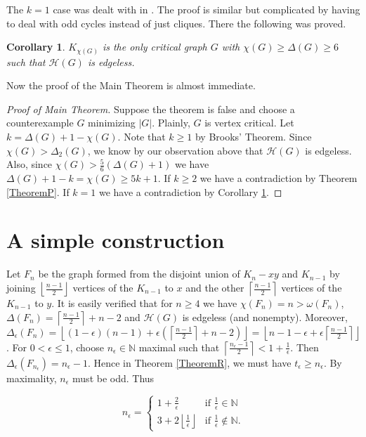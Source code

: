 \documentclass[12pt]{amsart}
\theoremstyle{plain}
\newtheorem{cor}[thm]{Corollary}
\theoremstyle{definition}
\theoremstyle{remark}
\newcommand{\fancy}[1]{\mathcal{#1}}
\newcommand{\card}[1]{\left|#1\right|}
\newcommand{\ceil}[1]{\left\lceil#1\right\rceil}
\newcommand{\floor}[1]{\left\lfloor#1\right\rfloor}
\newcommand{\parens}[1]{\left( #1 \right)}
\begin{document}
The $k = 1$ case was dealt with in \cite{DeltaCritical}.  The proof is similar but complicated by having to deal with odd cycles instead of just cliques. There the following was proved.

\begin{cor}\label{CorN}
$K_{\chi(G)}$ is the only critical graph $G$ with $\chi(G) \geq \Delta(G) \geq 6$ such that $\mathcal{H}(G)$ is edgeless.
\end{cor}

\noindent Now the proof of the Main Theorem is almost immediate.

\begin{proof}[Proof of Main Theorem]
Suppose the theorem is false and choose a counterexample $G$ minimizing $\card{G}$.  Plainly, $G$ is vertex critical.  Let $k = \Delta(G) + 1 - \chi(G)$.  Note that $k \geq 1$ by Brooks' Theorem. Since $\chi(G) > \Delta_2(G)$, we know by our observation above that $\mathcal{H}(G)$ is edgeless.  Also, since $\chi(G) > \frac{5}{6}(\Delta(G) + 1)$ we have $\Delta(G) + 1 - k = \chi(G) \geq 5k + 1$.  If $k \geq 2$ we have a contradiction by Theorem \ref{TheoremP}.  If $k = 1$ we have a contradiction by Corollary \ref{CorN}. 
\end{proof}

\section{A simple construction}
Let $F_n$ be the graph formed from the disjoint union of $K_n - xy$ and $K_{n-1}$ by joining $\floor{\frac{n-1}{2}}$ vertices of the $K_{n-1}$ to $x$ and the other $\ceil{\frac{n-1}{2}}$ vertices of the $K_{n-1}$ to $y$.  It is easily verified that for $n \geq 4$ we have $\chi(F_n) = n > \omega(F_n)$, $\Delta(F_n) = \ceil{\frac{n-1}{2}} + n - 2$ and $\fancy{H}(G)$ is edgeless (and nonempty).  Moreover, $\Delta_\epsilon(F_n) = \floor{(1-\epsilon)(n-1) + \epsilon\parens{\ceil{\frac{n-1}{2}} + n - 2}} = \floor{n - 1 - \epsilon + \epsilon\ceil{\frac{n-1}{2}}}$.  For $0 < \epsilon \leq 1$, choose $n_\epsilon \in \mathbb{N}$ maximal such that $\ceil{\frac{n_\epsilon - 1}{2}} < 1 + \frac{1}{\epsilon}$.  Then $\Delta_\epsilon(F_{n_\epsilon}) = n_\epsilon - 1$.  Hence in Theorem \ref{TheoremR}, we must have $t_\epsilon \geq n_\epsilon$. By maximality, $n_\epsilon$ must be odd.  Thus

\[n_\epsilon = \begin{cases}
1 + \frac{2}{\epsilon} & \text{if } \frac{1}{\epsilon} \in \mathbb{N} \\
3 + 2\floor{\frac{1}{\epsilon}} & \text{if } \frac{1}{\epsilon} \not\in \mathbb{N}.
\end{cases}\]
\end{document}
